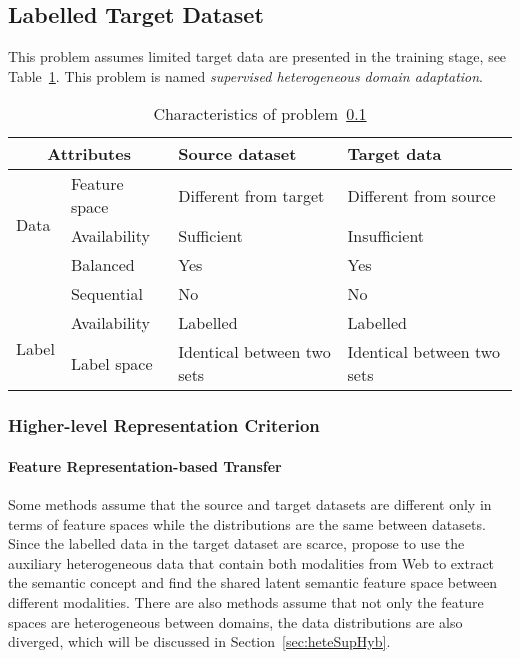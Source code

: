 \documentclass[prodmode]{acmsmall}  %
\begin{document}
\subsection{Labelled Target Dataset}
\label{sec:HETESsup}
This problem assumes limited target data are presented in the training stage, see Table~\ref{tab:HETESsup}. This problem is named \textit{supervised heterogeneous domain adaptation}.
\begin{table}[htbp!]
\caption{Characteristics of problem~\ref{sec:HETESsup}}
\label{tab:HETESsup}
\begin{center}
\begin{small}
\begin{tabular}{|p{1cm}<{\centering}|m{2.5cm}<{\centering}|m{4.3cm}<{\centering}|m{4.3cm}<{\centering}|}
\hline
\multicolumn{2}{|c|}{Attributes} & Source dataset & Target data \\
\hline \hline
\multirow{3}{*}{Data} & Feature space & Different from target & {\color{red}Different from source} \\ 
\cline{2-4}{} & Availability & Sufficient & {\color{red}Insufficient} \\
\cline{2-4}{} & Balanced & Yes & Yes \\
\cline{2-4}{} & Sequential & No & No \\
\cline{2-4}
\hline \hline
\multirow{2}{*}{Label} & Availability & Labelled & Labelled \\
\cline{2-4}{}  & Label space & Identical between two sets & Identical between two sets \\ 
\cline{2-4}
\hline
\end{tabular}
\end{small}
\end{center}
\end{table}
\subsubsection{Higher-level Representation Criterion}
\label{sec:heteSupHLR}
\paragraph{Feature Representation-based Transfer} 
Some methods assume that the source and target datasets are different only in terms of feature spaces while the distributions are the same between datasets.
Since the labelled data in the target dataset are scarce,  propose to use the auxiliary heterogeneous data that contain both modalities from Web to extract the semantic concept and find the shared latent semantic feature space between different modalities. There are also methods assume that not only the feature spaces are heterogeneous between domains, the data distributions are also diverged, which will be discussed in Section~\ref{sec:heteSupHyb}.
\end{document}
